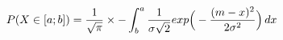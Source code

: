 \documentclass[preview]{standalone}
\begin{document}
\begin{align*}
P( X \in [a;b] ) = { \frac{1}{\sqrt{\pi}} } \times - \int_b^a { { \frac{1}{\sigma \sqrt{2}} } exp\Big(-{ {(m - x)^2} \over {2 \sigma^2} }\Big) } \, dx
\end{align*}
\end{document}
